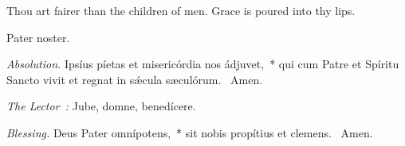 {

  {
    \def\preant{\setgrefactor{17}\ifprintwhointones{\normalsize\vspace{-\baselineskip}\noindent\emph{Second Cantor intones:}

    }{}
    \large}
    \def\preantafter{\setgrefactor{17}\large}
    \def\prepsalm{\normalsize}
    \def\anttranslation{We have received thy mercy, O God, in the midst of thy temple.}
  }

  {
    \bigskip
    \def\preant{\setgrefactor{17}\ifprintwhointones{\normalsize\vspace{-\baselineskip}\noindent\emph{First Cantor intones:}

    }{}
    \large}
    \def\preantafter{\setgrefactor{17}\large}
    \def\prepsalm{\normalsize}
    \def\anttranslation{In the Lord's days shall abundance of peace arise and flourish.}
  }

  {
    \bigskip
    \def\preant{\setgrefactor{17}\ifprintwhointones{\noindent\emph{Second Cantor intones:}

    }{}
    \large}
    \def\preantafter{\setgrefactor{17}\large}
    \def\prepsalm{\normalsize}
    \def\anttranslation{Truth is sprung out of the earth, and justice hath looked down from heaven.}
  }

  \bigskip
  {
    {Thou art fairer than the children of men.}
    {Grace is poured into thy lips.}
  }

  {
    {Pater noster.}

    \smallskip
    \emph{Absolution.} Ipsíus píetas et misericórdia nos ádjuvet,~* qui cum Patre et Spíritu Sancto vivit et regnat in sǽcula sæculórum. \Rbar{}~Amen.

    \emph{The Lector~:} Jube, domne, benedícere.

    \emph{Blessing.} Deus Pater omnípotens,~* sit nobis propítius et clemens. \Rbar{}~Amen.
  }

}
